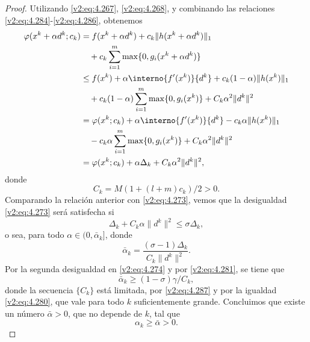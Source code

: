 \begin{proof}
Utilizando \eqref{v2:eq:4.267}, \eqref{v2:eq:4.268}, y combinando las relaciones \eqref{v2:eq:4.284}-\eqref{v2:eq:4.286}, obtenemos
\begin{align*}
\varphi(x^k + \alpha d^k; c_k) &= f(x^k + \alpha d^k) + c_k \|h(x^k + \alpha d^k)\|_1 \\
&\quad + c_k \sum_{i=1}^m \max\{0, g_i(x^k + \alpha d^k)\} \\
&\le f(x^k) + \alpha \interno{f'(x^k)}{d^k} + c_k(1 - \alpha)\|h(x^k)\|_1 \\
&\quad + c_k(1 - \alpha) \sum_{i=1}^m \max\{0, g_i(x^k)\} + C_k \alpha^2 \|d^k\|^2 \\
&= \varphi(x^k; c_k) + \alpha \interno{f'(x^k)}{d^k} - c_k \alpha \|h(x^k)\|_1 \\
&\quad - c_k \alpha \sum_{i=1}^m \max\{0, g_i(x^k)\} + C_k \alpha^2 \|d^k\|^2 \\
&= \varphi(x^k; c_k) + \alpha \Delta_k + C_k \alpha^2 \|d^k\|^2,
\end{align*}
donde
\begin{equation}
C_k = M(1 + (l + m)c_k)/2 > 0.
\label{v2:eq:4.287}
\end{equation}
Comparando la relación anterior con \eqref{v2:eq:4.273}, vemos que la desigualdad \eqref{v2:eq:4.273} será satisfecha si
\[
\Delta_k + C_k \alpha \|d^k\|^2 \le \sigma \Delta_k,
\]
o sea, para todo $\alpha \in (0, \bar{\alpha}_k]$, donde
\[
\bar{\alpha}_k = \frac{(\sigma - 1)\Delta_k}{C_k \|d^k\|^2}.
\]
Por la segunda desigualdad en \eqref{v2:eq:4.274} y por \eqref{v2:eq:4.281}, se tiene que
\[
\bar{\alpha}_k \ge (1 - \sigma)\gamma / C_k,
\]
donde la secuencia $\{C_k\}$ está limitada, por \eqref{v2:eq:4.287} y por la igualdad \eqref{v2:eq:4.280}, que vale para todo $k$ suficientemente grande. Concluimos que existe un número $\bar{\alpha} > 0$, que no depende de $k$, tal que
\begin{equation}
\alpha_k \ge \bar{\alpha} > 0.
\label{v2:eq:4.288}
\end{equation}


\end{proof}

